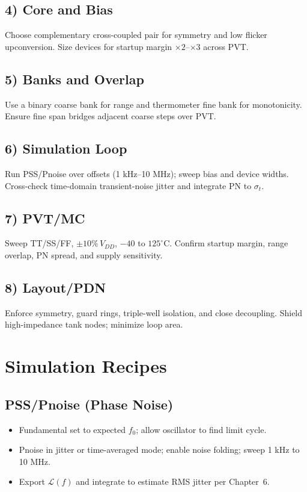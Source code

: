 \subsection*{4) Core and Bias}
Choose complementary cross-coupled pair for symmetry and low flicker upconversion. Size devices for startup margin $\times 2$--$\times 3$ across PVT.

\subsection*{5) Banks and Overlap}
Use a binary coarse bank for range and thermometer fine bank for monotonicity. Ensure fine span bridges adjacent coarse steps over PVT.

\subsection*{6) Simulation Loop}
Run PSS/Pnoise over offsets (1 kHz--10 MHz); sweep bias and device widths. Cross-check time-domain transient-noise jitter and integrate PN to $\sigma_t$.

\subsection*{7) PVT/MC}
Sweep TT/SS/FF, $\pm10\%\,V_{DD}$, $-40$ to $125^\circ$C. Confirm startup margin, range overlap, PN spread, and supply sensitivity.

\subsection*{8) Layout/PDN}
Enforce symmetry, guard rings, triple-well isolation, and close decoupling. Shield high-impedance tank nodes; minimize loop area.

\section{Simulation Recipes}
\subsection*{PSS/Pnoise (Phase Noise)}
\begin{itemize}
  \item Fundamental set to expected $f_0$; allow oscillator to find limit cycle.
  \item Pnoise in jitter or time-averaged mode; enable noise folding; sweep 1 kHz to 10 MHz.
  \item Export $\mathcal{L}(f)$ and integrate to estimate RMS jitter per Chapter~6.
\end{itemize}

